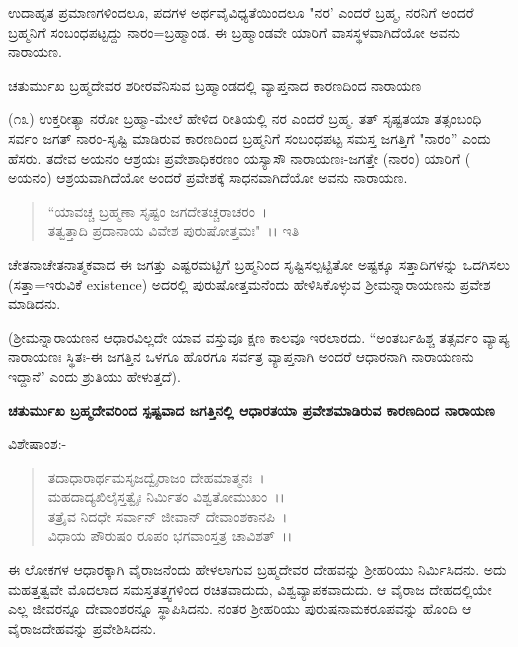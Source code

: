 ಉದಾಹೃತ ಪ್ರಮಾಣಗಳಿಂದಲೂ, ಪದಗಳ ಅರ್ಥವೈವಿಧ್ಯತೆಯಿಂದಲೂ "ನರ' ಎಂದರೆ ಬ್ರಹ್ಮ, ನರನಿಗೆ ಅಂದರೆ ಬ್ರಹ್ಮನಿಗೆ ಸಂಬಂಧಪಟ್ಟದ್ದು ನಾರಂ=ಬ್ರಹ್ಮಾಂಡ. ಈ ಬ್ರಹ್ಮಾಂಡವೇ ಯಾರಿಗೆ ವಾಸಸ್ಥಳವಾಗಿದೆಯೋ ಅವನು ನಾರಾಯಣ.

\begin{center}
ಚತುರ್ಮುಖ ಬ್ರಹ್ಮದೇವರ ಶರೀರವೆನಿಸುವ ಬ್ರಹ್ಮಾಂಡದಲ್ಲಿ ವ್ಯಾಪ್ತನಾದ ಕಾರಣದಿಂದ ನಾರಾಯಣ
\end{center}

(೧೩) ಉಕ್ತರೀತ್ಯಾ ನರೋ ಬ್ರಹ್ಮಾ-ಮೇಲೆ ಹೇಳಿದ ರೀತಿಯಲ್ಲಿ ನರ ಎಂದರೆ ಬ್ರಹ್ಮ. ತತ್ ಸೃಷ್ಟತಯಾ ತತ್ಸಂಬಂಧಿ ಸರ್ವಂ ಜಗತ್ ನಾರಂ-ಸೃಷ್ಟಿ ಮಾಡಿರುವ ಕಾರಣದಿಂದ ಬ್ರಹ್ಮನಿಗೆ ಸಂಬಂಧಪಟ್ಟ ಸಮಸ್ತ ಜಗತ್ತಿಗೆ "ನಾರಂ'' ಎಂದು ಹೆಸರು. ತದೇವ ಅಯನಂ ಆಶ್ರಯಃ ಪ್ರವೇಶಾಧಿಕರಣಂ ಯಸ್ಯಾಸೌ ನಾರಾಯಣಃ-ಜಗತ್ತೇ (ನಾರಂ) ಯಾರಿಗೆ ( ಅಯನಂ) ಆಶ್ರಯವಾಗಿದೆಯೋ ಅಂದರೆ ಪ್ರವೇಶಕ್ಕೆ ಸಾಧನವಾಗಿದೆಯೋ ಅವನು ನಾರಾಯಣ.

\begin{verse}
 “ಯಾವಚ್ಚ ಬ್ರಹ್ಮಣಾ ಸೃಷ್ಟಂ ಜಗದೇತಚ್ಚರಾಚರಂ~।\\ ತತ್ವತ್ತಾದಿ ಪ್ರದಾನಾಯ ವಿವೇಶ ಪುರುಷೋತ್ತಮಃ"~।। ಇತಿ 
\end{verse}

\noindent
ಚೇತನಾಚೇತನಾತ್ಮಕವಾದ ಈ ಜಗತ್ತು ಎಷ್ಟರಮಟ್ಟಿಗೆ ಬ್ರಹ್ಮನಿಂದ ಸೃಷ್ಟಿಸಲ್ಪಟ್ಟಿತೋ ಅಷ್ಟಕ್ಕೂ ಸತ್ತಾದಿಗಳನ್ನು ಒದಗಿಸಲು (ಸತ್ತಾ=ಇರುವಿಕೆ existence) ಅದರಲ್ಲಿ ಪುರುಷೋತ್ತಮನೆಂದು ಹೇಳಿಸಿಕೊಳ್ಳುವ ಶ‍್ರೀಮನ್ನಾರಾಯಣನು ಪ್ರವೇಶ ಮಾಡಿದನು.

(ಶ‍್ರೀಮನ್ನಾರಾಯಣನ ಆಧಾರವಿಲ್ಲದೇ ಯಾವ ವಸ್ತುವೂ ಕ್ಷಣ ಕಾಲವೂ ಇರಲಾರದು. “ಅಂತರ್ಬಹಿಶ್ಚ ತತ್ಸರ್ವಂ ವ್ಯಾಪ್ಯ ನಾರಾಯಣಃ ಸ್ಥಿತಃ-ಈ ಜಗತ್ತಿನ ಒಳಗೂ ಹೊರಗೂ ಸರ್ವತ್ರ ವ್ಯಾಪ್ತನಾಗಿ ಅಂದರೆ ಆಧಾರನಾಗಿ ನಾರಾಯಣನು ಇದ್ದಾನೆ' ಎಂದು ಶ್ರುತಿಯು ಹೇಳುತ್ತದೆ).

\begin{center}
\textbf{ಚತುರ್ಮುಖ ಬ್ರಹ್ಮದೇವರಿಂದ ಸ್ಪಷ್ಟವಾದ ಜಗತ್ತಿನಲ್ಲಿ ಆಧಾರತಯಾ ಪ್ರವೇಶಮಾಡಿರುವ ಕಾರಣದಿಂದ ನಾರಾಯಣ}
\end{center}

\noindent
ವಿಶೇಷಾಂಶ:-

\begin{verse}
ತದಾಧಾರಾರ್ಥಮಸೃಜದ್ವೈರಾಜಂ ದೇಹಮಾತ್ಮನಃ~।\\ ಮಹದಾದ್ಯಖಿಲೈಸ್ತತ್ವೈಃ ನಿರ್ಮಿತಂ ವಿಶ್ವತೋಮುಖಂ~।।\\ ತತ್ರೈವ ನಿದಧೇ ಸರ್ವಾನ್ ಜೀವಾನ್ ದೇವಾಂಶಕಾನಪಿ~।\\ ವಿಧಾಯ ಪೌರುಷಂ ರೂಪಂ ಭಗವಾಂಸ್ತತ್ರ ಚಾವಿಶತ್~।।
\end{verse}


\noindent
ಈ ಲೋಕಗಳ ಆಧಾರಕ್ಕಾಗಿ ವೈರಾಜನೆಂದು ಹೇಳಲಾಗುವ ಬ್ರಹ್ಮದೇವರ ದೇಹವನ್ನು ಶ‍್ರೀಹರಿಯು ನಿರ್ಮಿಸಿದನು. ಅದು ಮಹತ್ತತ್ವವೇ ಮೊದಲಾದ ಸಮಸ್ತತತ್ತ್ವಗಳಿಂದ ರಚಿತವಾದುದು, ವಿಶ್ವವ್ಯಾಪಕವಾದುದು. ಆ ವೈರಾಜ ದೇಹದಲ್ಲಿಯೇ ಎಲ್ಲ ಜೀವರನ್ನೂ ದೇವಾಂಶರನ್ನೂ ಸ್ಥಾಪಿಸಿದನು. ನಂತರ ಶ‍್ರೀಹರಿಯು ಪುರುಷನಾಮಕರೂಪವನ್ನು ಹೊಂದಿ ಆ ವೈರಾಜದೇಹವನ್ನು ಪ್ರವೇಶಿಸಿದನು.

